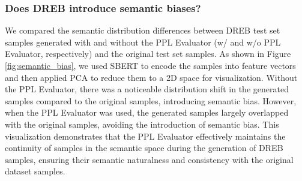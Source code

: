 \documentclass[letterpaper]{article} %
\begin{document}
\subsubsection{Does DREB introduce semantic biases?}
We compared the semantic distribution differences between DREB test set samples generated with and without the PPL Evaluator (w/ and w/o PPL Evaluator, respectively) and the original test set samples. As shown in Figure \ref{fig:semantic_bias}, we used SBERT \cite{reimers2019sentence} to encode the samples into feature vectors and then applied PCA \cite{smith2002tutorial} to reduce them to a 2D space for visualization. Without the PPL Evaluator, there was a noticeable distribution shift in the generated samples compared to the original samples, introducing semantic bias. However, when the PPL Evaluator was used, the generated samples largely overlapped with the original samples, avoiding the introduction of semantic bias. This visualization demonstrates that the PPL Evaluator effectively maintains the continuity of samples in the semantic space during the generation of DREB samples, ensuring their semantic naturalness and consistency with the original dataset samples.
\end{document}
